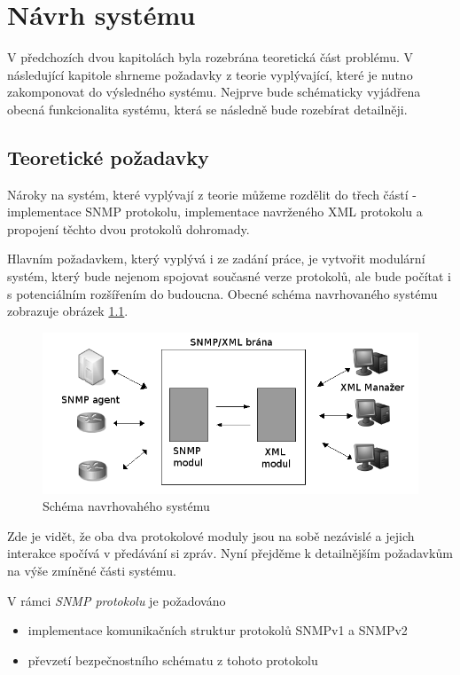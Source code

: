 \chapter{Návrh systému}
\label{kap_navrh_systemu}
V předchozích dvou kapitolách byla rozebrána teoretická část problému. V následující kapitole shrneme požadavky z teorie vyplývající, které je nutno zakomponovat do
výsledného systému. Nejprve bude schématicky vyjádřena obecná funkcionalita systému, která se následně bude rozebírat detailněji.

\section{Teoretické požadavky}
Nároky na systém, které vyplývají z teorie můžeme rozdělit do třech částí - implementace SNMP protokolu, implementace navrženého XML protokolu a propojení těchto dvou protokolů dohromady.

Hlavním požadavkem, který vyplývá i ze zadání práce, je vytvořit modulární systém, který bude nejenom spojovat současné verze protokolů, ale bude počítat i s potenciálním rozšířením do
budoucna. Obecné schéma navrhovaného systému zobrazuje obrázek \ref{obr_an_obecne_schema}. 

\begin{figure}[htp]
	\begin{center}
		\includegraphics[width=15cm]{obrazky/03_obecne_schema.png}
		\caption{Schéma navrhovahého systému}
		\label{obr_an_obecne_schema}
	\end{center}
\end{figure}

Zde je vidět, že oba dva protokolové moduly jsou na sobě nezávislé a jejich interakce spočívá v předávání si zpráv. Nyní přejděme k detailnějším požadavkům na výše zmíněné části systému.

V rámci \textit{SNMP protokolu} je požadováno
\begin{itemize}
	\item implementace komunikačních struktur protokolů SNMPv1 a SNMPv2
	\item převzetí bezpečnostního schématu z tohoto protokolu
\end{itemize}

